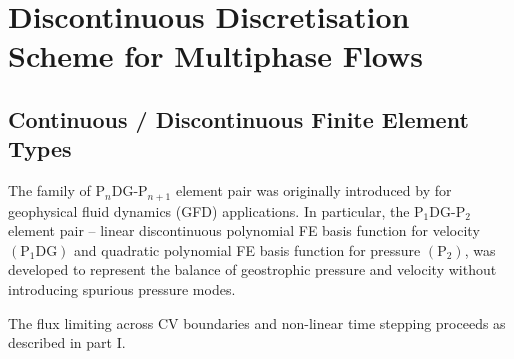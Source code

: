 \documentclass[preprint,authoryear,12pt]{elsarticle}
\begin{document}
\setlength\parindent{0pt}


\section{Discontinuous Discretisation Scheme for Multiphase Flows}
\subsection{Continuous / Discontinuous Finite Element Types} \label{element_types_section}
The family of P$_{n}$DG-P$_{n+1}$ element pair was originally
introduced by \citet{cotter_2009b} \citep[see
  also][]{cotter_2009a,cotter_2011} for geophysical fluid dynamics
(GFD) applications. In particular, the P$_{1}$DG-P$_{2}$ element pair
-- linear discontinuous polynomial FE basis function for velocity
$\left(\text{P}_{1}\text{DG}\right)$ and quadratic polynomial FE basis
function for pressure $\left(\text{P}_{2}\right)$, was developed to
represent the balance of geostrophic pressure and velocity without
introducing spurious pressure modes.

The flux limiting across CV boundaries and non-linear time stepping proceeds 
as described in part I. 
\end{document}
